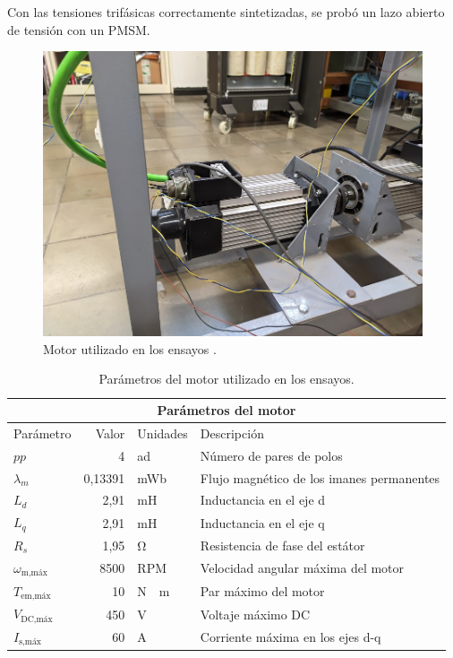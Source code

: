 Con las tensiones trifásicas correctamente sintetizadas, se probó un lazo abierto de tensión con un PMSM.

\begin{figure}[H]
	\centering
	\includegraphics[width=0.7\linewidth]{fig/motorLab}
	\caption{Motor utilizado en los ensayos \cite{mavilor2018}.}
\end{figure}


\begin{table}[H]
	\begin{tabular}{|p{2cm}||r|p{1.5cm}|p{8cm}|}
		\hline
		\multicolumn{4}{|c|}{Parámetros del motor} \\
		\hline
		Parámetro & Valor & Unidades & Descripción \\
		\hline
		\(pp\) & 4 & ad & Número de pares de polos \\
		\(\lambda_m\) & 0,13391 & mWb & Flujo magnético de los imanes permanentes \\
		\(L_d\) & 2,91 & mH & Inductancia en el eje d \\
		\(L_q\) & 2,91 & mH & Inductancia en el eje q \\
		\(R_s\) & 1,95 & \unit{\ohm} & Resistencia de fase del estátor \\
		\(\omega_{\text{m,máx}}\) & 8500 & RPM & Velocidad angular máxima del motor \\
		\(T_{\text{em,máx}}\) & 10 & \unit{N \cdot m} & Par máximo del motor \\
		\(V_{\text{DC,máx}}\) & 450 & \unit{V} & Voltaje máximo DC \\
		\(I_{\text{s,máx}}\) & 60 & \unit{A} & Corriente máxima en los ejes d-q \\
		\hline
	\end{tabular}
	\caption{Parámetros del motor utilizado en los ensayos.}
\end{table}

